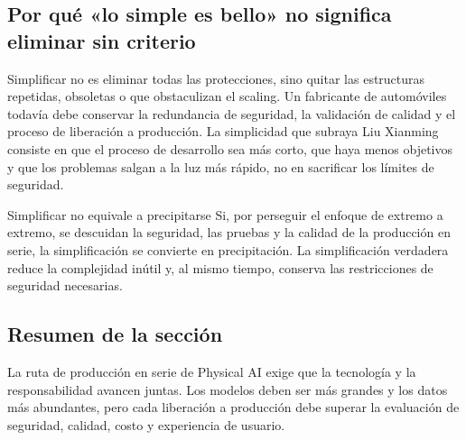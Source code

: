 \subsection{Por qué «lo simple es bello» no significa eliminar sin criterio}

Simplificar no es eliminar todas las protecciones, sino quitar las estructuras repetidas, obsoletas o que obstaculizan el scaling. Un fabricante de automóviles todavía debe conservar la redundancia de seguridad, la validación de calidad y el proceso de liberación a producción. La simplicidad que subraya Liu Xianming consiste en que el proceso de desarrollo sea más corto, que haya menos objetivos y que los problemas salgan a la luz más rápido, no en sacrificar los límites de seguridad.

\begin{warningbox}{Simplificar no equivale a precipitarse}
Si, por perseguir el enfoque de extremo a extremo, se descuidan la seguridad, las pruebas y la calidad de la producción en serie, la simplificación se convierte en precipitación. La simplificación verdadera reduce la complejidad inútil y, al mismo tiempo, conserva las restricciones de seguridad necesarias.
\end{warningbox}

\subsection{Resumen de la sección}

La ruta de producción en serie de Physical AI exige que la tecnología y la responsabilidad avancen juntas. Los modelos deben ser más grandes y los datos más abundantes, pero cada liberación a producción debe superar la evaluación de seguridad, calidad, costo y experiencia de usuario.
